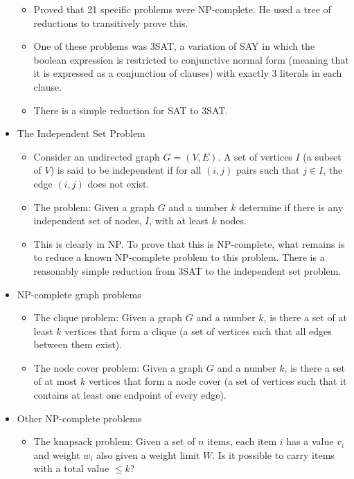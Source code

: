 \documentclass{article}
\begin{document}
\begin{itemize}
    \begin{itemize}
        \item Proved that 21 specific problems were NP-complete. He used a tree of reductions to transitively prove this.
        \item One of these problems was 3SAT, a variation of SAY in which the boolean expression is restricted to conjunctive normal form (meaning that it is expressed as a conjunction of clauses) with exactly 3 literals in each clause.
        \item There is a simple reduction for SAT to 3SAT.
    \end{itemize}
    \item The Independent Set Problem
    \begin{itemize}
        \item Consider an undirected graph \(G=(V,E)\). A set of vertices \(I\) (a subset of \(V\)) is said to be independent if for all \((i,j)\) pairs such that \(j\in I\), the edge \((i,j)\) does not exist.
        \item The problem: Given a graph \(G\) and a number \(k\) determine if there is any independent set of nodes, \(I\), with at least \(k\) nodes.
        \item This is clearly in NP. To prove that this is NP-complete, what remains is to reduce a known NP-complete problem to this problem. There is a reasonably simple reduction from 3SAT to the independent set problem.
    \end{itemize}
    \item NP-complete graph problems
    \begin{itemize}
        \item The clique problem: Given a graph \(G\) and a number \(k\), is there a set of at least \(k\) vertices that form a clique (a set of vertices such that all edges between them exist).
        \item The node cover problem: Given a graph \(G\) and a number \(k\), is there a set of at most \(k\) vertices that form a node cover (a set of vertices such that it contains at least one endpoint of every edge).
    \end{itemize}
    \item Other NP-complete problems
    \begin{itemize}
        \item The knapsack problem: Given a set of \(n\) items, each item \(i\) has a value \(v_i\) and weight \(w_i\) also given a weight limit \(W\). Is it possible to carry items with a total value \(\leq k\)?

\end{itemize}
\end{itemize}
\end{document}
